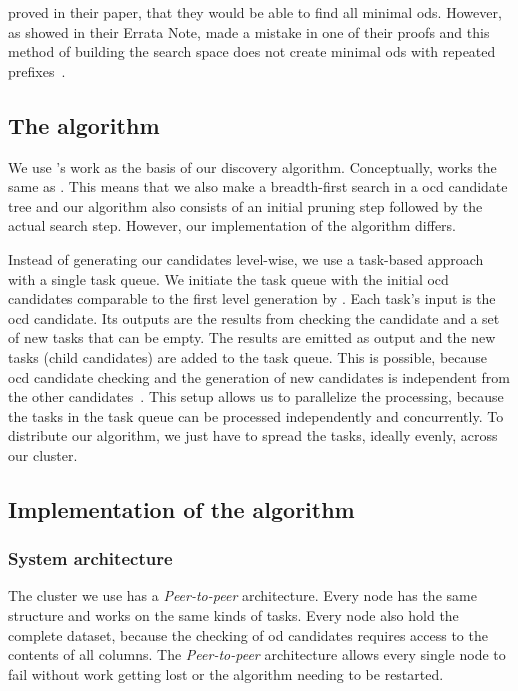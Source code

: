    proved in their paper, that they would be able to find all minimal \glspl{od}.
  However, as \citeauthor{szlichta:errata} showed in their Errata Note, \citeauthor{consonni} made a mistake in one of their proofs and this method of building the search space does not create minimal \glspl{od} with repeated prefixes~\cite{szlichta:errata}.

\subsection{The \dodo{} algorithm}\label{sec:dodo}

  We use \citeauthor{consonni}'s work as the basis of our discovery algorithm.
  Conceptually, \dodo{} works the same as \ocddiscover{}.
  This means that we also make a breadth-first search in a \gls{ocd} candidate tree and our algorithm also consists of an initial pruning step followed by the actual search step.
  However, our implementation of the algorithm differs.

  Instead of generating our candidates level-wise, we use a task-based approach with a single task queue.
  We initiate the task queue with the initial \gls{ocd} candidates comparable to the first level generation by \citeauthor{consonni}.
  Each task's input is the \gls{ocd} candidate.
  Its outputs are the results from checking the candidate and a set of new tasks that can be empty.
  The results are emitted as output and the new tasks (child candidates) are added to the task queue.
  This is possible, because \gls{ocd} candidate checking and the generation of new candidates is independent from the other candidates~\cite{consonni}.
  This setup allows us to parallelize the processing, because the tasks in the task queue can be processed independently and concurrently.
  To distribute our algorithm, we just have to spread the tasks, ideally evenly, across our cluster.

\subsection{Implementation of the \dodo{} algorithm}\label{sec:architecture}

  

\subsubsection{System architecture}
The cluster we use has a \emph{Peer-to-peer} architecture.
Every node has the same structure and works on the same kinds of tasks.
Every node also hold the complete dataset, because the checking of \gls{od} candidates requires access to the contents of all columns.
The \emph{Peer-to-peer} architecture allows every single node to fail without work getting lost or the algorithm needing to be restarted.

